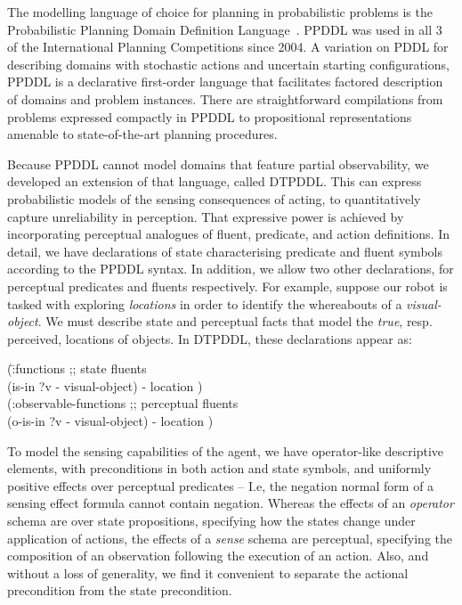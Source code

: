 
The modelling language of choice for planning in probabilistic
problems is the Probabilistic Planning Domain Definition
Language~\cite{younes:littman:04,younes:etal:2005}. PPDDL was used in
all 3 of the International Planning Competitions since 2004. A
variation on PDDL for describing domains with stochastic actions and
uncertain starting configurations, PPDDL is a declarative first-order
language that facilitates factored description of domains and problem
instances. There are straightforward compilations from problems
expressed compactly in PPDDL to propositional representations amenable
to state-of-the-art planning procedures.

Because PPDDL cannot model domains that feature partial observability,
we developed an extension of that language, called DTPDDL. This can
express probabilistic models of the sensing consequences of acting, to
quantitatively capture unreliability in perception. That expressive
power is achieved by incorporating perceptual analogues of fluent,
predicate, and action definitions. In detail, we have declarations of
state characterising predicate and fluent symbols according to the
PPDDL syntax. In addition, we allow two other declarations, for
perceptual predicates and fluents respectively. For example, suppose
our robot is tasked with exploring {\em locations} in order to
identify the whereabouts of a {\em visual-object}. We must describe
state and perceptual facts that model the {\em true}, resp. perceived,
locations of objects. In DTPDDL, these declarations appear as:

\small
\begin{tabtt}
(\=:functions  ;; state fluents\\
  \> (is-in ?v - visual-object) - location )\\
(:observable-functions  ;; perceptual fluents\\
  \> (o-is-in ?v - visual-object) - location )
\end{tabtt}
\normalsize

\noindent To model the sensing capabilities of the agent, we have
operator-like descriptive elements, with preconditions in both action
and state symbols, and uniformly positive effects over perceptual
predicates -- I.e, the negation normal form of a sensing effect
formula cannot contain negation. Whereas the effects of an {\em
operator} schema are over state propositions, specifying how the
states change under application of actions, the effects of a {\em
sense} schema are perceptual, specifying the composition of an
observation following the execution of an action. Also, and without a
loss of generality, we find it convenient to separate the actional
precondition from the state precondition.

